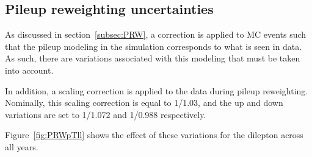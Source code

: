 \subsection{Pileup reweighting uncertainties}
As discussed in section~\ref{subsec:PRW}, a correction is applied to MC events such that the pileup modeling in the simulation corresponds to what is seen in data. As such, there are variations associated with this modeling
that must be taken into account.

In addition, a scaling correction is applied to the data during pileup reweighting. Nominally, this scaling correction is equal to 1/1.03, and the up and down variations are set to 1/1.072 and 1/0.988 respectively.

Figure~\ref{fig:PRWpTll} shows the effect of these variations for the dilepton \pt across all years.

